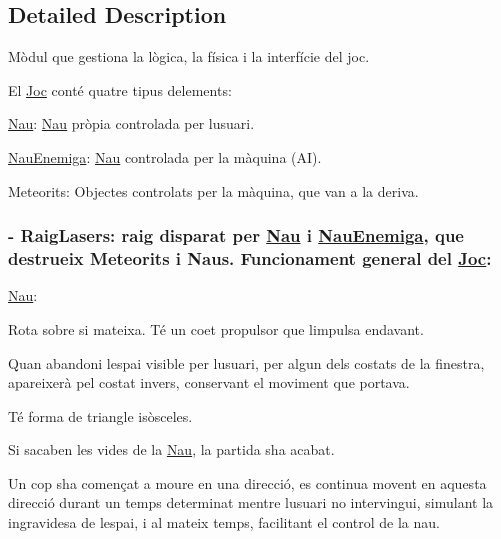 \subsection{Detailed Description}
Mòdul que gestiona la lògica, la física i la interfície del joc. 

El \hyperlink{class_joc}{Joc} conté quatre tipus d\textquotesingle{}elements\+:
\begin{DoxyItemize}
\item \hyperlink{class_nau}{Nau}\+: \hyperlink{class_nau}{Nau} pròpia controlada per l\textquotesingle{}usuari.
\item \hyperlink{class_nau_enemiga}{Nau\+Enemiga}\+: \hyperlink{class_nau}{Nau} controlada per la màquina (A\+I).
\item Meteorits\+: Objectes controlats per la màquina, que van a la deriva. \subsubsection*{-\/ Raig\+Lasers\+: raig disparat per \hyperlink{class_nau}{Nau} i \hyperlink{class_nau_enemiga}{Nau\+Enemiga}, que destrueix Meteorits i Naus. Funcionament general del \hyperlink{class_joc}{Joc}\+: }
\end{DoxyItemize}

\hyperlink{class_nau}{Nau}\+:
\begin{DoxyItemize}
\item Rota sobre si mateixa. Té un coet propulsor que l\textquotesingle{}impulsa endavant.
\item Quan abandoni l\textquotesingle{}espai visible per l\textquotesingle{}usuari, per algun dels costats de la finestra, apareixerà pel costat invers, conservant el moviment que portava.
\item Té forma de triangle isòsceles.
\item Si s\textquotesingle{}acaben les vides de la \hyperlink{class_nau}{Nau}, la partida s\textquotesingle{}ha acabat.
\item Un cop s\textquotesingle{}ha començat a moure en una direcció, es continua movent en aquesta direcció durant un temps determinat mentre l\textquotesingle{}usuari no intervingui, simulant la ingravidesa de l\textquotesingle{}espai, i al mateix temps, facilitant el control de la nau.
\end{DoxyItemize}

